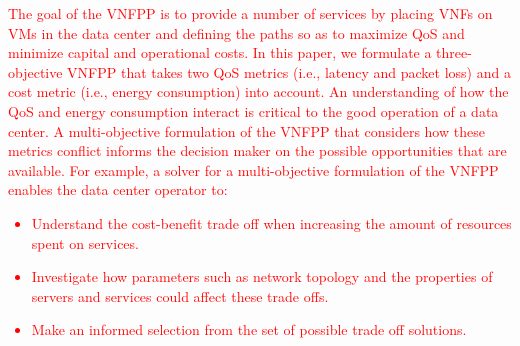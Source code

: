 \textcolor{red}{The goal of the VNFPP is to provide a number of services by placing VNFs on VMs in the data center and defining the paths so as to maximize QoS and minimize capital and operational costs. In this paper, we formulate a three-objective VNFPP that takes two QoS metrics (i.e., latency and packet loss) and a cost metric (i.e., energy consumption) into account. An understanding of how the QoS and energy consumption interact is critical to the good operation of a data center. A multi-objective formulation of the VNFPP that considers how these metrics conflict informs the decision maker on the possible opportunities that are available. For example, a solver for a multi-objective formulation of the VNFPP enables the data center operator to:
\begin{itemize}
	\item Understand the cost-benefit trade off when increasing the amount of resources spent on services.
	\item Investigate how parameters such as network topology and the properties of servers and services could affect these trade offs.
	\item Make an informed selection from the set of possible trade off solutions.
\end{itemize}
}

